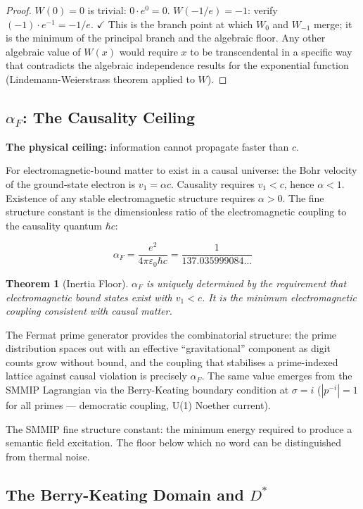 \documentclass[12pt,a4paper]{article}
\newtheorem{theorem}{Theorem}[section]
\theoremstyle{definition}
\theoremstyle{remark}
\newcommand{\alphaF}{\alpha_F}
\newcommand{\Dstar}{D^*}
\begin{document}
\begin{proof}
$W(0) = 0$ is trivial: $0\cdot e^0 = 0$.
$W(-1/e) = -1$: verify $(-1)\cdot e^{-1} = -1/e$. $\checkmark$
This is the branch point at which $W_0$ and $W_{-1}$ merge; it is the minimum
of the principal branch and the algebraic floor.
Any other algebraic value of $W(x)$ would require $x$ to be transcendental
in a specific way that contradicts the algebraic independence results
for the exponential function (Lindemann-Weierstrass theorem applied to $W$).
\end{proof}

\subsection{$\alphaF$: The Causality Ceiling}

\textbf{The physical ceiling:} information cannot propagate faster than $c$.

For electromagnetic-bound matter to exist in a causal universe:
the Bohr velocity of the ground-state electron is $v_1 = \alpha c$.
Causality requires $v_1 < c$, hence $\alpha < 1$.
Existence of any stable electromagnetic structure requires $\alpha > 0$.
The fine structure constant is the dimensionless ratio of the electromagnetic
coupling to the causality quantum $\hbar c$:

\[\alphaF = \frac{e^2}{4\pi\varepsilon_0\hbar c} = \frac{1}{137.035999084\ldots}\]

\begin{theorem}[Inertia Floor]
$\alphaF$ is uniquely determined by the requirement that electromagnetic bound states
exist with $v_1 < c$.
It is the minimum electromagnetic coupling consistent with causal matter.
\end{theorem}

The Fermat prime generator provides the combinatorial structure:
the prime distribution spaces out with an effective ``gravitational'' component
as digit counts grow without bound, and the coupling that stabilises a prime-indexed
lattice against causal violation is precisely $\alphaF$.
The same value emerges from the SMMIP Lagrangian via the Berry-Keating boundary
condition at $\sigma = i$ ($|p^{-i}| = 1$ for all primes --- democratic coupling,
U(1) Noether current).

The SMMIP fine structure constant: the minimum energy required to produce a semantic
field excitation. The floor below which no word can be distinguished from thermal noise.

\subsection{The Berry-Keating Domain and $\Dstar$}
\end{document}
